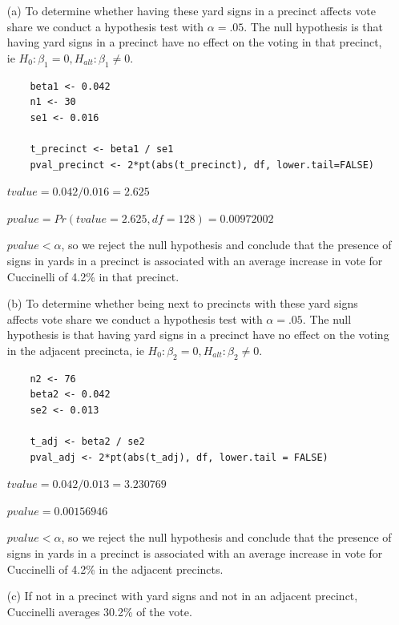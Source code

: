 \documentclass[12pt,letterpaper]{article}
\begin{document}
\begin{enumerate}
	\item [(a)] To determine whether having these yard signs in a precinct affects vote share we conduct a hypothesis test with $\alpha = .05$.  The null hypothesis is that having yard signs in a precinct have no effect on the voting in that precinct, ie $H_0: \beta_1 = 0, H_{alt}: \beta_1 \ne 0$.  

  \begin{lstlisting}
    beta1 <- 0.042
    n1 <- 30
    se1 <- 0.016

    t_precinct <- beta1 / se1
    pval_precinct <- 2*pt(abs(t_precinct), df, lower.tail=FALSE)
  \end{lstlisting}
  
	$tvalue =  0.042/0.016 = 2.625$
	
	$pvalue =  Pr(tvalue = 2.625, df = 128) = 0.00972002$
	
  $pvalue < \alpha$, so we reject the null hypothesis and conclude that the presence of signs in yards in a precinct is associated with an average increase in vote for Cuccinelli of 4.2\% in that precinct.

	\item [(b)]  To determine whether being
	next to precincts with these yard signs affects vote
	share we conduct a hypothesis test with $\alpha = .05$. The null hypothesis is that having yard signs in a precinct have no effect on the voting in the adjacent precincta, ie $H_0: \beta_2 = 0, H_{alt}: \beta_2 \ne 0$. 
	
  \begin{lstlisting}
    n2 <- 76
    beta2 <- 0.042
    se2 <- 0.013

    t_adj <- beta2 / se2
    pval_adj <- 2*pt(abs(t_adj), df, lower.tail = FALSE)
  \end{lstlisting}

	$tvalue =  0.042/0.013 = 3.230769$
	
	$pvalue = 0.00156946$
	
  $pvalue < \alpha$, so we reject the null hypothesis and conclude that the presence of signs in yards in a precinct is associated with an average increase in vote for Cuccinelli of 4.2\% in the adjacent precincts.	
  
	\item [(c)] %
	If not in a precinct with yard signs and not in an adjacent precinct, Cuccinelli averages 30.2\% of the vote.
	

\end{enumerate}
\end{document}
